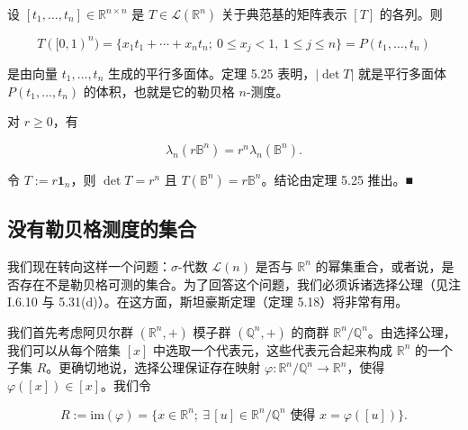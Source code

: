 \begin{remark}

\begin{items}
\item

设 $ [t_1, \ldots, t_n] \in \mathbb{R}^{n \times n} $ 是 $ T \in \mathcal{L}(\mathbb{R}^n) $ 关于典范基的矩阵表示 $ [T] $ 的各列。则

\[
T([0, 1)^n) = \{ x_1 t_1 + \cdots + x_n t_n ;\ 0 \le x_j < 1, \ 1 \le j \le n \} = P(t_1, \ldots, t_n)
\]

是由向量 $ t_1, \ldots, t_n $ 生成的平行多面体。定理 5.25 表明，$ |\det T| $ 就是平行多面体 $ P(t_1, \ldots, t_n) $ 的体积，也就是它的勒贝格 $ n $-测度。

\item

对 $ r \ge 0 $，有

\[
\lambda_n(r\mathbb{B}^n) = r^n \lambda_n(\mathbb{B}^n) .
\]

\proofhead
令 $ T := r\mathbf{1}_n $，则 $ \det T = r^n $ 且 $ T(\mathbb{B}^n) = r\mathbb{B}^n $。结论由定理 5.25 推出。\nobreak\hspace{0.35em}■
\end{items}

\end{remark}

\subsection*{没有勒贝格测度的集合}

我们现在转向这样一个问题：$ \sigma $-代数 $ \mathcal{L}(n) $ 是否与 $ \mathbb{R}^n $ 的幂集重合，或者说，是否存在不是勒贝格可测的集合。为了回答这个问题，我们必须诉诸选择公理（见注 I.6.10 与 5.31(d)）。在这方面，斯坦豪斯定理（定理 5.18）将非常有用。

我们首先考虑阿贝尔群 $ (\mathbb{R}^n, +) $ 模子群 $ (\mathbb{Q}^n, +) $ 的商群 $ \mathbb{R}^n/\mathbb{Q}^n $。由选择公理，我们可以从每个陪集 $ [x] $ 中选取一个代表元，这些代表元合起来构成 $ \mathbb{R}^n $ 的一个子集 $ R $。更确切地说，选择公理保证存在映射 $ \varphi: \mathbb{R}^n/\mathbb{Q}^n \to \mathbb{R}^n $，使得 $ \varphi([x]) \in [x] $。我们令

\begin{equation}
R := \mathrm{im}(\varphi) = \{ x \in \mathbb{R}^n ;\ \exists\, [u] \in \mathbb{R}^n/\mathbb{Q}^n \text{ 使得 } x = \varphi([u]) \} .\tag{5.15}
\end{equation}

